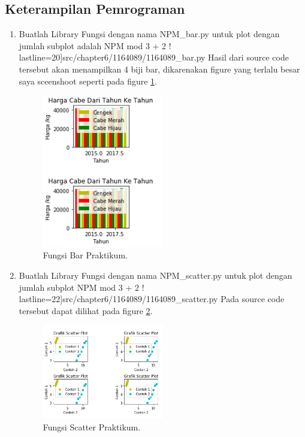 \subsection{Keterampilan Pemrograman}
\begin{enumerate}

\item Buatlah Library Fungsi dengan nama NPM\_bar.py untuk plot dengan jumlah subplot adalah NPM mod 3 + 2 !
	 lastline=20]{src/chapter6/1164089/1164089_bar.py}
	\subitem Hasil dari source code tersebut akan menampilkan 4 biji bar, dikarenakan figure yang terlalu besar saya sceenshoot 				    seperti pada figure \ref{YNC6-11}.

	\begin{figure}[!htbp!]
		\centerline{\includegraphics[width=0.5\textwidth]{figures/chapter6/1164089/YNC6-11.png}}
		\caption{Fungsi Bar Praktikum.}
		\label{YNC6-11}
	\end{figure}

\item Buatlah Library Fungsi dengan nama NPM\_scatter.py untuk plot dengan jumlah subplot NPM mod 3 + 2 !
	 lastline=22]{src/chapter6/1164089/1164089_scatter.py}
	\subitem Pada source code tersebut dapat dilihat pada figure \ref{YNC6-12}.

	\begin{figure}[!htbp!]
		\centerline{\includegraphics[width=0.5\textwidth]{figures/chapter6/1164089/YNC6-12.png}}
		\caption{Fungsi Scatter Praktikum.}
		\label{YNC6-12}
	\end{figure}


\end{enumerate}
